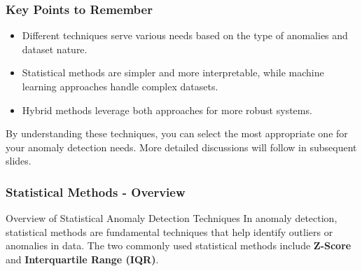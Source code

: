 \documentclass{beamer}
\begin{document}
\begin{frame}[fragile]
    \frametitle{Key Points to Remember}
    \begin{itemize}
        \item Different techniques serve various needs based on the type of anomalies and dataset nature.
        \item Statistical methods are simpler and more interpretable, while machine learning approaches handle complex datasets.
        \item Hybrid methods leverage both approaches for more robust systems.
    \end{itemize}
    By understanding these techniques, you can select the most appropriate one for your anomaly detection needs. More detailed discussions will follow in subsequent slides.
\end{frame}

\begin{frame}[fragile]
    \frametitle{Statistical Methods - Overview}
    \begin{block}{Overview of Statistical Anomaly Detection Techniques}
        In anomaly detection, statistical methods are fundamental techniques that help identify outliers or anomalies in data. The two commonly used statistical methods include \textbf{Z-Score} and \textbf{Interquartile Range (IQR)}.
    \end{block}
\end{frame}
\end{document}
